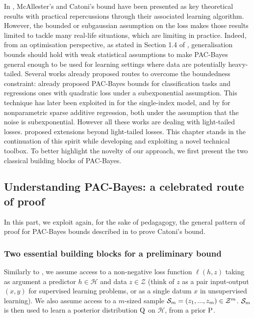 In , McAllester's and Catoni's bound \citep{mcallester2003pac,catoni2007pac} have been presented as key theoretical results with practical repercussions through their associated learning algorithm. However, the bounded or subgaussian assumption on the loss makes those results limited to tackle many real-life situations, which are limiting in practice.
Indeed, from an optimisation perspective, as stated in Section 1.4 of , generalisation bounds should hold with weak statistical assumptions to make PAC-Bayes general enough to be used for learning settings where data are potentially heavy-tailed. Several works already proposed routes to overcome the boundedness constraint:  \citet[][Chapter 5]{catoni2004statistical} already proposed PAC-Bayes bounds for classification tasks and regressions ones with quadratic loss under a subexponential assumption. This technique has later been exploited in \citet{alquier2013sparse} for the single-index model, and by \citet{guedj2013pac} for nonparametric sparse additive regression, both under the assumption that the noise is subexponential. However all these works are dealing with light-tailed losses.
\citet{alquier2018simpler,holland2019pac, kuzborskij2019efron, haddouche2021pac} proposed extensions beyond light-tailed losses.
This chapter stands in the continuation of this spirit while developing and exploiting a novel technical toolbox.
To better highlight the novelty of our approach, we first present the two classical building blocks of PAC-Bayes.

\subsection{Understanding PAC-Bayes: a celebrated route of proof}
In this part, we exploit again, for the sake of pedagagogy, the general pattern of proof for PAC-Bayes bounds described in  to prove Catoni's bound. 
\subsubsection{Two essential building blocks for a preliminary bound}

Similarly to , we  assume access to a non-negative loss function $\ell(h,z)$ taking as argument a predictor $h\in\mathcal{H}$  and data $z\in\mathcal{Z}$ (think of $z$ as a pair input-output $(x,y)$ for supervised learning problems, or as a single datum $x$ in unsupervised learning). We also assume access to a $m$-sized sample $\Sm= (z_1,...,z_m)\in\mathcal{Z}^m$. $\Sm$ is then used to learn a posterior distribution $\Q$ on $\mathcal{H}$, from a prior $\P$.

